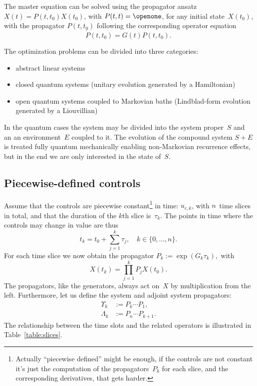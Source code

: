 \documentclass[aps, pra, a4paper, longbibliography, superscriptaddress]{revtex4-1}
\newcommand{\I}{\openone}
\newcommand{\be}{\begin{equation}}
\newcommand{\ee}{\end{equation}}
\newcommand{\spr}{\Upsilon}
\begin{document}
The master equation can be solved using the propagator ansatz
$X(t) = P(t, t_0) X(t_0)$, with $P(t,t) = \I$, for any initial state~$X(t_0)$,
with the propagator $P(t,t_0)$ following the corresponding operator equation
\be
\label{eq:prop}
\dot{P}(t, t_0) = G(t) P(t, t_0).
\ee


The optimization problems can be divided into three categories:
\begin{itemize}
\item
abstract linear systems
\item
closed quantum systems (unitary evolution generated by a Hamiltonian)
\item
open quantum systems coupled to Markovian baths (Lindblad-form
evolution generated by a Liouvillian)
\end{itemize}
In the quantum cases the system may be divided into the system
proper~$S$ and an an environment~$E$ coupled to it.
The evolution of the compound system $S+E$ is treated
fully quantum mechanically enabling non-Markovian recurrence effects,
but in the end we are only interested in the state of~$S$.



\subsection{Piecewise-defined controls}

Assume that the controls are
piecewise constant\footnote{Actually ``piecewise defined'' might be
  enough, if the controls are not constant it's just the computation
  of the propagators~$P_k$ for each slice, and the corresponding derivatives, that gets harder.}
in time: $u_{c, k}$, with $n$~time slices in total,
and that the duration of the $k$th slice is~$\tau_k$.
The points in time where the controls may change in value are thus
\be
t_k = t_0 + \sum_{j=1}^{k} \tau_j, \quad k \in \{0, \ldots, n\}.
\ee
For each time slice we now obtain the propagator
$
P_k := \exp(G_k \tau_k),
$
with
\be
\label{eq:Xn}
X(t_k) = \prod_{j=1}^{k} P_j X(t_0).
\ee
The propagators, like the generators, always act on~$X$ by multiplication
from the left.
Furthermore, let us define the system and adjoint system propagators:
\begin{align}
\spr_k &:= P_k \cdots P_1,\\      %
\Lambda_k &:= P_n \cdots P_{k+1}.
\end{align}
The relationship between the time slots and the related operators is
illustrated in Table~\ref{table:slices}.
\end{document}
